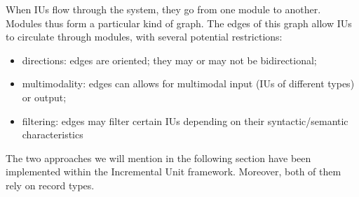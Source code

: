 \documentclass[11pt]{article}
\begin{document}
				
				When IUs flow through the system, they go from one module to another. Modules thus form a particular kind of graph. The edges of this graph allow IUs to circulate through modules, with several potential restrictions:
				\begin{itemize}
					\item directions: edges are oriented; they may or may not be bidirectional;\vspace{-2mm}
					\item multimodality: edges can allows for multimodal input  (IUs of different types) or output;\vspace{-2mm}
					\item filtering: edges may filter certain IUs depending on their syntactic/semantic characteristics
				\end{itemize}
				
				The two approaches we will mention in the following section have been implemented within the Incremental Unit framework. Moreover, both of them rely on record types.
			
			
			
			
			
		

		
\end{document}
